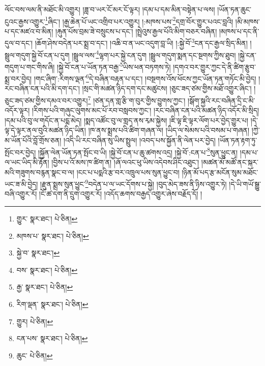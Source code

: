 ལོང་བས་ལམ་ནི་མཐོང་མི་འགྱུར། །ཟླ་བ་ཡར་ངོ་མར་ངོ་ལྟར། །དམ་པ་དམ་མིན་བསྟེན་པ་ལས། །ཡོན་ཏན་ཆུང་ངུའང་རྒྱས་འགྱུར་\footnote{གྱུར་  སྣར་ཐང་།  པེ་ཅིན། }ཞིང་། །རྒྱ་ཆེན་པོ་ཡང་འགྲིབ་པར་འགྱུར། །:མཁས་པས་\footnote{མཁས་པ་  སྣར་ཐང་།  པེ་ཅིན། }དགྲ་བོར་གྱུར་པའང་བླའི། །མི་མཁས་པ་དང་མཛའ་བ་མིན། །རྐུན་པོས་བྲམ་ཟེ་བསྲུངས་པ་དང་། །སྤྲེའུས་རྒྱལ་པོའི་མིག་བཅར་བཞིན། །མཁས་པ་དང་ནི་དུལ་བ་དང་། །ཆོག་ཤེས་བདེན་པར་སྨྲ་བ་དང་། །འཆི་བ་ན་ཡང་འདུག་བླ་ཡི། །:སྐྱེ་བོ་\footnote{སྐྱེ་བ་  སྣར་ཐང་། }ངན་དང་རྒྱལ་སྲིད་མིན། །སྦྲུལ་གདུག་སྐྱེ་བོ་ངན་པ་དུག །སྦྲུལ་ལས་\footnote{བས་  སྣར་ཐང་།  པེ་ཅིན། }ལྷག་པར་སྐྱེ་ངན་དུག །སྦྲུལ་གདུག་སྨན་དང་སྔགས་ཀྱིས་ཐུབ། །སྐྱེ་ངན་གདུག་པ་གང་གིས་ཞི། །སྐྱེ་བོ་ངན་པ་ཡོན་ཏན་བརྒྱ་\footnote{རྒྱ་  སྣར་ཐང་།  པེ་ཅིན། }ཡིས་ཕན་བཏགས་ཏེ། །དགའ་བར་གྱུར་ཀྱང་དེ་ནི་ཚིག་རྩུབ་སྨྲ་བར་བྱེད། །གང་ཞིག་:རིགས་ལྡན་\footnote{རིག་ལྡན་  སྣར་ཐང་།  པེ་ཅིན། }དེ་བཞིན་བརྟན་པ་དང་། །བསྔགས་འོས་ཕོངས་ཀྱང་ཡོན་ཏན་གཏོང་མི་བྱེད། །རང་བཞིན་ངན་པའི་མི་དག་དང་། །སྲང་གི་མཚན་ཉིད་དག་དང་མཚུངས། །ཅུང་ཟད་ཙམ་གྱིས་མཐོ་འགྱུར་ཞིང་། །ཅུང་ཟད་ཙམ་གྱིས་དམའ་བར་འགྱུར།\footnote{གྱུར།  པེ་ཅིན། } །ཙན་དན་གླ་རྩི་ག་བུར་གྱིས་བྱུགས་ཀྱང་། །སྒོག་སྐྱའི་རང་བཞིན་དྲི་ང་མི་འདོར་ལྟར། །རིགས་པའི་གཞུང་ལུགས་མང་པོ་རབ་བསླབས་ཀྱང་། །རང་བཞིན་ངན་པའི་མཚན་ཉིད་འདོར་མི་སྲིད། །དམ་པའི་བུ་ལ་གདོང་ན་པདྨ་མེད། །སྨད་འཚོང་བུ་ལ་གླད་ནས་རྭམ་སྐྱེས། །ཇི་ལྟ་ཇི་ལྟར་ལོག་པར་བྱེད་གྱུར་པ། །དེ་ལྟ་དེ་ལྟར་ནལ་བུའི་མཚན་ཉིད་ཡིན། །ཁ་ནས་སྨྲས་པའི་ཚིག་གཞན་ལ། །ཡིད་ལ་སེམས་པའི་བསམ་པ་གཞན། །ཀྱེ་མ་ཡོན་པོའི་བློ་གྲོས་ཅན། །འདི་ཡི་རང་བཞིན་སུ་ཡིས་སྤྲུལ། །འབད་པས་སྐྱོན་ནི་ལེན་པར་བྱེད། །ཡོན་ཏན་རྟག་ཏུ་སྤོང་བར་བྱེད། །སྐྱོན་ལེན་ཡོན་ཏན་སྤོང་བ་ཡི། །སྐྱེ་བོ་ངན་པ་ཆུ་ཚགས་འདྲ། །སྐྱེ་བོ་:ངན་པ་\footnote{ངན་པས་  སྣར་ཐང་།  པེ་ཅིན། }སུན་ཕྱུང་ན། །དམ་པ་ལ་ཡང་ཡིད་མི་རྟོན། །བྱིས་པ་འོ་མས་ཁ་ཚིག་ན། །ཞོ་ལའང་ཕུ་ཡིས་འདེབས་ཤིང་འཐུང་། །མཚན་མོ་མཚོ་ནང་སྐར་མའི་གཟུགས་བརྙན་སྣང་བ་ལ། །ངང་པ་པདྨའི་རྩ་བར་འཁྲུལ་པས་སུན་ཕྱུང་བ། །ཉིན་མོ་པད་རྩ་མངོན་སུམ་མཐོང་ཡང་ཟ་མི་བྱེད། །རྫུན་སྨྲས་སུན་ཕྱུང་\footnote{ཆུང་  པེ་ཅིན། }བདེན་པ་ལ་ཡང་དོགས་པ་སྐྱེ། །བུད་མེད་ཟས་ནི་ཉིས་འགྱུར་ཏེ། །དེ་ཡི་གཡོ་སྒྱུ་བཞི་འགྱུར་རོ། །ངོ་ཚ་དག་ནི་དྲུག་འགྱུར་རོ། །འདོད་ཆགས་བརྒྱད་འགྱུར་ཞེས་བརྗོད་དོ། །
